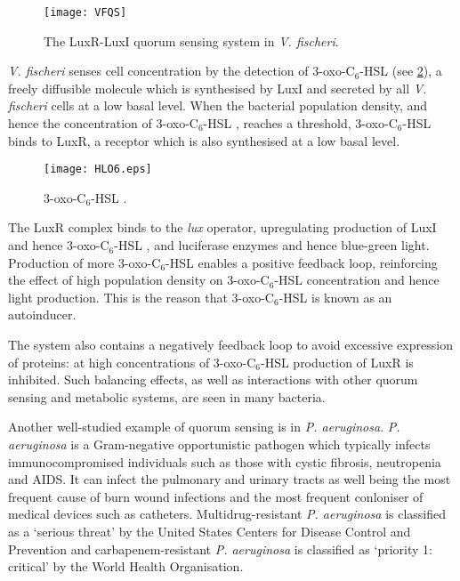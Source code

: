 \begin{figure}[H]
	\begin{center}
		\texttt{[image: VFQS]}
		\caption{The LuxR-LuxI quorum sensing system in \textit{V. fischeri}. \label{fgr:VFQS}}
	\end{center}
\end{figure}


\textit{V. fischeri} senses cell concentration by the detection of 3-oxo-C$_6$-HSL \cite{Eberhard1981} (see \ref{fgr:HLO6}), a freely diffusible\cite{Kaplan1985} molecule which is synthesised by LuxI\cite{Parsek1999, Watson2002} and secreted by all \textit{V. fischeri} cells\cite{Schaefer1996} at a low basal level\cite{Miller2001}. 
When the bacterial population density, and hence the concentration of 3-oxo-C$_6$-HSL , reaches a threshold, 3-oxo-C$_6$-HSL  binds to LuxR\cite{Hanzelka1995,Choi1991,Choi1992}, a receptor which is also synthesised at a low basal level. 

\begin{figure}[H]
	\begin{center}
		\texttt{[image: HLO6.eps]}
		\caption{3-oxo-C$_6$-HSL . \label{fgr:HLO6}}
	\end{center}
\end{figure}

The LuxR complex binds to the \textit{lux} operator, upregulating production of LuxI and hence 3-oxo-C$_6$-HSL , and luciferase enzymes and hence blue-green light\cite{Devine1989,Engebrecht1983,Visick2000}.
Production of more 3-oxo-C$_6$-HSL  enables a positive feedback loop, reinforcing the effect of high population density on 3-oxo-C$_6$-HSL  concentration and hence light production.
This is the reason that 3-oxo-C$_6$-HSL  is known as an autoinducer.

The system also contains a negatively feedback loop to avoid excessive expression of proteins: at high concentrations of 3-oxo-C$_6$-HSL  production of LuxR is inhibited\cite{Dunlap1989}. Such balancing effects, as well as interactions with other quorum sensing and metabolic systems, are seen in many bacteria\cite{Dubern2008,Miller2001}.


Another well-studied example of quorum sensing is in \textit{P. aeruginosa}\cite{Dubern2008,Hodgkinson2011,Jimenez2012}.
\textit{P. aeruginosa} is a Gram-negative opportunistic pathogen which typically infects immunocompromised individuals such as those with cystic fibrosis, neutropenia and AIDS. It can infect the pulmonary and urinary tracts as well being the most frequent cause of burn wound infections and the most frequent conloniser of medical devices such as catheters\cite{Bodey1983}. Multidrug-resistant \textit{P. aeruginosa} is classified as a `serious threat' by the United States Centers for Disease Control and Prevention\cite{ResistanceUS} and carbapenem-resistant \textit{P. aeruginosa} is classified as `priority 1: critical' by the World Health Organisation\cite{WHO}.

